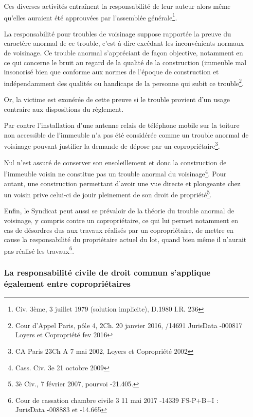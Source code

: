 			Ces diverses activités entraînent la responsabilité de leur auteur alors même qu'elles auraient été approuvées par l'assemblée générale\footnote{Civ. 3ème, 3 juillet 1979 (solution implicite), D.1980 I.R. 236}.
			
			La responsabilité pour troubles de voisinage suppose rapportée la preuve du caractère anormal de ce trouble, c'est-à-dire excédant les inconvénients normaux de voisinage. Ce trouble anormal s’appréciant de façon objective, notamment en ce qui concerne le bruit au regard de la qualité de la construction (immeuble mal insonorisé bien que conforme aux normes de l’époque de construction et indépendamment des qualités ou handicaps de la personne qui subit ce trouble\footnote{Cour d'Appel Paris, pôle 4, 2\degres Ch. 20 janvier 2016, /14691 JurisData -000817 Loyers et Copropriété fev 2016 }.
			
			Or, la victime est exonérée de cette preuve si le trouble provient d'un usage contraire aux dispositions du règlement.
			
			Par contre l’installation d’une antenne relais de téléphone mobile sur la toiture non accessible de l’immeuble n’a pas été considérée comme un trouble anormal de voisinage pouvant justifier la demande de dépose par un copropriétaire\footnote{CA Paris 23\degres Ch A 7 mai 2002, Loyers et Copropriété 2002 }.
			
			Nul n’est assuré de conserver son ensoleillement et donc la construction de l’immeuble voisin ne constitue pas un trouble anormal du voisinage\footnote{Cass. Civ. 3e 21 octobre 2009}. Pour autant, une construction permettant d’avoir une vue directe et plongeante chez un voisin prive celui-ci de jouir pleinement de son droit de propriété\footnote{3è Civ., 7 février 2007, pourvoi -21.405.}.
			
			Enfin, le Syndicat peut aussi se prévaloir de la théorie du trouble anormal de voisinage, y compris contre un copropriétaire, ce qui lui permet notamment en cas de désordres dus aux travaux réalisés par un copropriétaire, de mettre en cause la responsabilité du propriétaire actuel du lot, quand bien même il n’aurait pas réalisé les travaux\footnote{Cour de cassation chambre civile 3 11 mai 2017 -14339 FS-P+B+I : JurisData -008883 et -14.665}.
		
		\subsubsection{La responsabilité civile de droit commun s’applique également entre copropriétaires}
		
